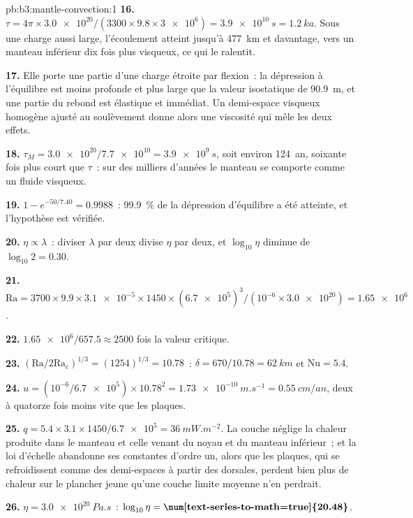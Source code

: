 \begin{solution}{pb:b3:mantle-convection:1}
\textbf{16.} $\tau = 4\pi\times\num{3.0e20}/(3300\times9.8\times\num{3e6}) =
\qty{3.9e10}{s} = \qty{1.2}{ka}$. Sous une charge aussi large, l'écoulement atteint
jusqu'à \qty{477}{km} et davantage, vers un manteau inférieur dix fois plus visqueux,
ce qui le ralentit.

\textbf{17.} Elle porte une partie d'une charge étroite par flexion~: la dépression à
l'équilibre est moins profonde et plus large que la valeur isostatique de \qty{90.9}{m}, et une partie du
rebond est élastique et immédiat. Un demi-espace visqueux homogène ajusté au
soulèvement donne alors une viscosité qui mêle les deux effets.

\textbf{18.} $\tau_M = \num{3.0e20}/\num{7.7e10} = \qty{3.9e9}{s}$, soit environ
\qty{124}{an}, soixante fois plus court que $\tau$~: sur des milliers d'années le
manteau se comporte comme un fluide visqueux.

\textbf{19.} $1 - e^{-50/7.40} = 0.9988$~: \qty{99.9}{\percent} de la
dépression d'équilibre a été atteinte, et l'hypothèse est vérifiée.

\textbf{20.} $\eta \propto \lambda$~: diviser $\lambda$ par deux divise $\eta$ par deux, et
$\log_{10}\eta$ diminue de $\log_{10}2 = 0.30$.

\textbf{21.} $\mathrm{Ra} = 3700\times9.9\times\num{3.1e-5}\times1450\times
(\num{6.7e5})^3/(10^{-6}\times\num{3.0e20}) = \num{1.65e6}$.

\textbf{22.} $\num{1.65e6}/657.5 \approx 2500$ fois la valeur critique.

\textbf{23.} $(\mathrm{Ra}/2\mathrm{Ra}_c)^{1/3} = (1254)^{1/3} = 10.78$~: $\delta
= 670/10.78 = \qty{62}{km}$ et $\mathrm{Nu} = 5.4$.

\textbf{24.} $u = (10^{-6}/\num{6.7e5})\times10.78^2 = \qty{1.73e-10}{m.s^{-1}}
= \qty{0.55}{cm/an}$, deux à quatorze fois moins vite que les plaques.

\textbf{25.} $q = 5.4\times3.1\times1450/\num{6.7e5} = \qty{36}{mW.m^{-2}}$. La
couche néglige la chaleur produite dans le manteau et celle venant du
noyau et du manteau inférieur~; et la loi d'échelle abandonne ses constantes d'ordre un,
alors que les plaques, qui se refroidissent comme des demi-espaces à partir des dorsales, perdent bien plus de chaleur sur
le plancher jeune qu'une couche limite moyenne n'en perdrait.

\textbf{26.} $\eta = \qty{3.0e20}{Pa.s}$~: $\log_{10}\eta =
\textbf{\num[text-series-to-math=true]{20.48}}$.
\end{solution}
